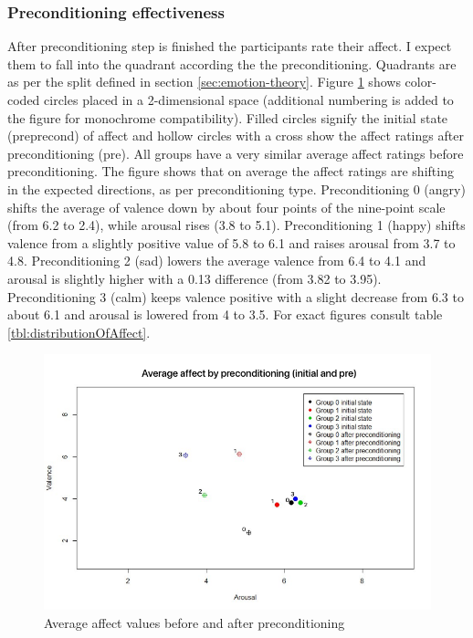 		\subsubsection{Preconditioning effectiveness}
		
		After preconditioning step is finished the participants rate their affect. I expect them to fall into the quadrant according the the preconditioning. Quadrants are as per the split defined in section \ref{sec:emotion-theory}. Figure \ref{fig:after-preconditioning-avg} shows color-coded circles placed in a 2-dimensional space (additional numbering is added to the figure for monochrome compatibility). Filled circles signify the initial state (preprecond) of affect and hollow circles with a cross show the affect ratings after preconditioning (pre). All groups have a very similar average affect ratings before preconditioning.
		The figure shows that on average the affect ratings are shifting in the expected directions, as per preconditioning type. 
		Preconditioning 0 (angry) shifts the average of valence down by about four points of the nine-point scale (from 6.2 to 2.4), while arousal rises (3.8 to 5.1). Preconditioning 1 (happy) shifts valence from a slightly positive value of 5.8 to 6.1 and raises arousal from 3.7 to 4.8. 
		Preconditioning 2 (sad) lowers the average valence from 6.4 to 4.1 and arousal is slightly higher with a 0.13 difference (from 3.82 to 3.95).
		Preconditioning 3 (calm) keeps valence positive with a slight decrease from 6.3 to about 6.1 and arousal is lowered from 4 to 3.5. For exact figures consult table \ref{tbl:distributionOfAffect}.
		
\begin{figure}[h!]
	\centering
	\includegraphics[width=1\linewidth]{graphics/after-preconditioning-avg}
	\caption[Avg Affect]{Average affect values before and after preconditioning}
	\label{fig:after-preconditioning-avg}
\end{figure}
		
